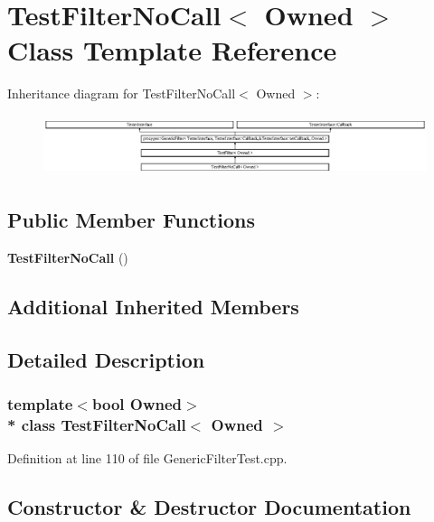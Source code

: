 \section{Test\+Filter\+No\+Call$<$ Owned $>$ Class Template Reference}
\label{classTestFilterNoCall}
Inheritance diagram for Test\+Filter\+No\+Call$<$ Owned $>$\+:\begin{figure}[H]
\begin{center}
\leavevmode
\includegraphics[height=1.780604cm]{classTestFilterNoCall}
\end{center}
\end{figure}
\subsection*{Public Member Functions}
\begin{DoxyCompactItemize}
\item 
{\bf Test\+Filter\+No\+Call} ()
\end{DoxyCompactItemize}
\subsection*{Additional Inherited Members}


\subsection{Detailed Description}
\subsubsection*{template$<$bool Owned$>$\\*
class Test\+Filter\+No\+Call$<$ Owned $>$}



Definition at line 110 of file Generic\+Filter\+Test.\+cpp.



\subsection{Constructor \& Destructor Documentation}
